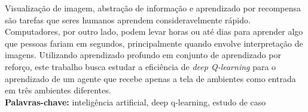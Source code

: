 Visualização de imagem, abstração de informação e aprendizado por recompensa são tarefas que seres humanos aprendem consideravelmente rápido.
Computadores, por outro lado, podem levar horas ou até dias para aprender algo que pessoas fariam em segundos, principalmente quando envolve interpretação de imagens.
Utilizando aprendizado profundo em conjunto de aprendizado por reforço, este trabalho busca estudar a eficiência de \textit{deep Q-learning} para o aprendizado de um agente que recebe apenas a tela de ambientes como entrada em três ambientes diferentes.
\\

\noindent%
\textbf{Palavras-chave:} inteligência artificial, deep q-learning, estudo de caso

%
%
